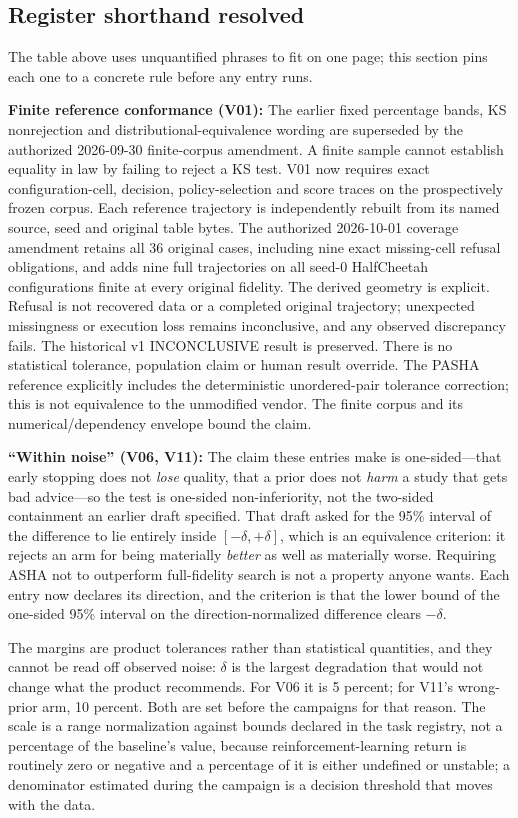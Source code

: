 \subsection{Register shorthand resolved}

The table above uses unquantified phrases to fit on one page; this
section pins each one to a concrete rule before any entry runs.

\textbf{Finite reference conformance (V01):} The earlier fixed
percentage bands, KS nonrejection and distributional-equivalence wording are
superseded by the authorized 2026-09-30 finite-corpus amendment. A finite
sample cannot establish equality in law by failing to reject a KS test.
V01 now requires exact configuration-cell, decision, policy-selection and
score traces on the prospectively frozen corpus. Each reference trajectory
is independently rebuilt from its named source, seed and original table
bytes. The authorized 2026-10-01 coverage amendment retains all 36 original
cases, including nine exact missing-cell refusal obligations, and adds nine
full trajectories on all seed-0 HalfCheetah configurations finite at every
original fidelity. The derived geometry is explicit. Refusal is not recovered
data or a completed original trajectory; unexpected missingness or execution
loss remains inconclusive, and any observed discrepancy fails. The historical
v1 INCONCLUSIVE result is preserved.
There is no statistical tolerance, population claim or human result override.
The PASHA reference explicitly includes the deterministic unordered-pair
tolerance correction; this is not equivalence to the unmodified vendor.
The finite corpus and its numerical/dependency envelope bound the claim.

\textbf{``Within noise'' (V06, V11):} The claim these entries make is
one-sided—that early stopping does not \emph{lose} quality, that a
prior does not \emph{harm} a study that gets bad advice—so the test is
one-sided non-inferiority, not the two-sided containment an earlier
draft specified. That draft asked for the 95\% interval of the
difference to lie entirely inside $[-\delta, +\delta]$, which is an
equivalence criterion: it rejects an arm for being materially
\emph{better} as well as materially worse. Requiring ASHA not to
outperform full-fidelity search is not a property anyone wants. Each
entry now declares its direction, and the criterion is that the lower
bound of the one-sided 95\% interval on the direction-normalized
difference clears $-\delta$.

The margins are product tolerances rather than statistical quantities,
and they cannot be read off observed noise: $\delta$ is the largest
degradation that would not change what the product recommends. For V06
it is 5 percent; for V11's wrong-prior arm, 10 percent. Both are set
before the campaigns for that reason. The scale is a range
normalization against bounds declared in the task registry, not a
percentage of the baseline's value, because reinforcement-learning
return is routinely zero or negative and a percentage of it is either
undefined or unstable; a denominator estimated during the campaign is a
decision threshold that moves with the data.

